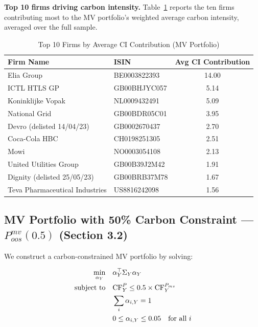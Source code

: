 \documentclass[12pt, a4paper]{article}
\begin{document}
\textbf{Top 10 firms driving carbon intensity.} Table~\ref{tab:top10} reports 
the ten firms contributing most to the MV portfolio's weighted average carbon 
intensity, averaged over the full sample.

\begin{table}[H]
    \centering
    \caption{Top 10 Firms by Average CI Contribution (MV Portfolio)}
    \label{tab:top10}
    \begin{tabular}{llc}
        \toprule
        \textbf{Firm Name} & \textbf{ISIN} & 
        \textbf{Avg CI Contribution} \\
        \midrule
        Elia Group                          & BE0003822393 & 14.00 \\
        ICTL HTLS GP                        & GB00BHJYC057 & 5.14  \\
        Koninklijke Vopak                   & NL0009432491 & 5.09  \\
        National Grid                       & GB00BDR05C01 & 3.95  \\
        Devro (delisted 14/04/23)           & GB0002670437 & 2.70  \\
        Coca-Cola HBC                       & CH0198251305 & 2.51  \\
        Mowi                                & NO0003054108 & 2.13  \\
        United Utilities Group              & GB00B39J2M42 & 1.91  \\
        Dignity (delisted 25/05/23)         & GB00BRB37M78 & 1.67  \\
        Teva Pharmaceutical Industries      & US8816242098 & 1.56  \\
        \bottomrule
    \end{tabular}
\end{table}

\subsection{MV Portfolio with 50\% Carbon Constraint --- 
$P^{mv}_{oos}(0.5)$ (Section 3.2)}

We construct a carbon-constrained MV portfolio by solving:

\begin{align}
    \min_{\alpha_Y} \quad & \alpha_Y^\top \Sigma_Y \alpha_Y \\
    \text{subject to} \quad 
    & \text{CF}^P_Y \leq 0.5 \times \text{CF}^{P_{mv}}_{Y} \notag \\
    & \sum_i \alpha_{i,Y} = 1 \notag \\
    & 0 \leq \alpha_{i,Y} \leq 0.05 \quad \text{for all } i \notag
\end{align}
\end{document}
